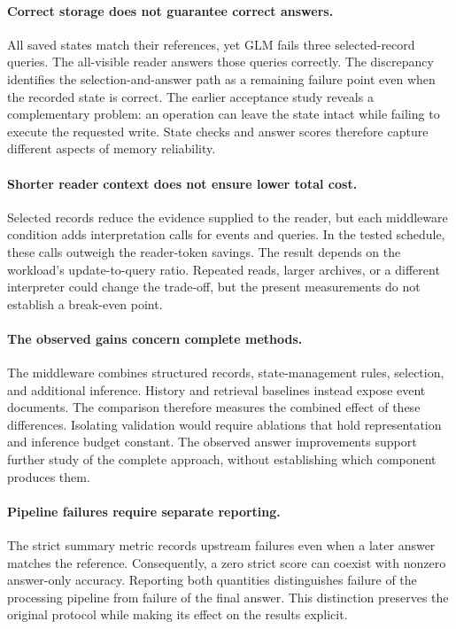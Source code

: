 \documentclass[11pt,a4paper]{article}
\begin{document}
\paragraph{Correct storage does not guarantee correct answers.}
All saved states match their references, yet GLM fails three selected-record queries. The all-visible reader answers those queries correctly. The discrepancy identifies the selection-and-answer path as a remaining failure point even when the recorded state is correct. The earlier acceptance study reveals a complementary problem: an operation can leave the state intact while failing to execute the requested write. State checks and answer scores therefore capture different aspects of memory reliability.

\paragraph{Shorter reader context does not ensure lower total cost.}
Selected records reduce the evidence supplied to the reader, but each middleware condition adds interpretation calls for events and queries. In the tested schedule, these calls outweigh the reader-token savings. The result depends on the workload's update-to-query ratio. Repeated reads, larger archives, or a different interpreter could change the trade-off, but the present measurements do not establish a break-even point.

\paragraph{The observed gains concern complete methods.}
The middleware combines structured records, state-management rules, selection, and additional inference. History and retrieval baselines instead expose event documents. The comparison therefore measures the combined effect of these differences. Isolating validation would require ablations that hold representation and inference budget constant. The observed answer improvements support further study of the complete approach, without establishing which component produces them.

\paragraph{Pipeline failures require separate reporting.}
The strict summary metric records upstream failures even when a later answer matches the reference. Consequently, a zero strict score can coexist with nonzero answer-only accuracy. Reporting both quantities distinguishes failure of the processing pipeline from failure of the final answer. This distinction preserves the original protocol while making its effect on the results explicit.
\end{document}
